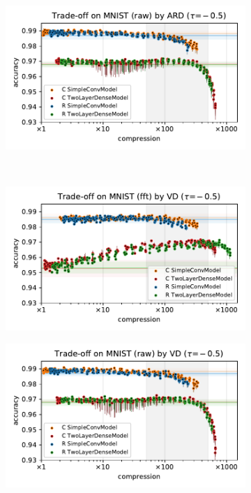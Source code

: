 \documentclass[a4paper,10pt,onecolumn]{article}
\begin{document}
\begin{figure}[b]
\begin{subfigure}[b]{0.5\columnwidth}
  \end{subfigure}%
  \begin{subfigure}[b]{0.5\columnwidth}
    \centering
    \includegraphics[width=\columnwidth]{figure__mnist-like__trade-off/appendix__ARD__mnist__raw__-0.5.pdf}
  \end{subfigure} \\ %
  \begin{subfigure}[b]{0.5\columnwidth}
    \centering
    \includegraphics[width=\columnwidth]{figure__mnist-like__trade-off/appendix__VD__mnist__fft__-0.5.pdf}
  \end{subfigure}%
  \begin{subfigure}[b]{0.5\columnwidth}
    \centering
    \includegraphics[width=\columnwidth]{figure__mnist-like__trade-off/appendix__VD__mnist__raw__-0.5.pdf}

\end{subfigure}
\end{figure}
\end{document}
